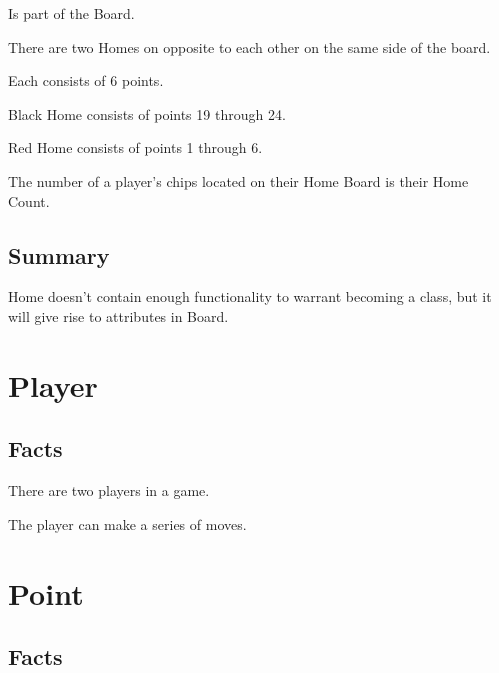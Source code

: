 \documentclass{report}
\begin{document}
    \begin{dashed}
        \item Is part of the Board.
        \item There are two Homes on opposite to each other on the same side of the board.
        \item Each consists of 6 points.
        \item Black Home consists of points 19 through 24.
        \item Red Home consists of points 1 through 6.
        \item The number of a player’s chips located on their Home Board is their Home Count.
    \end{dashed}

    \subsection{Summary}
    Home doesn't contain enough functionality to warrant becoming a class, but it will give rise to attributes in Board.





    \newpage
    \section{Player}

    \subsection{Facts}

    \begin{dashed}
        \item There are two players in a game.
        \item The player can make a series of moves.
    \end{dashed}





    \newpage
    \section{Point}

    \subsection{Facts}
\end{document}
